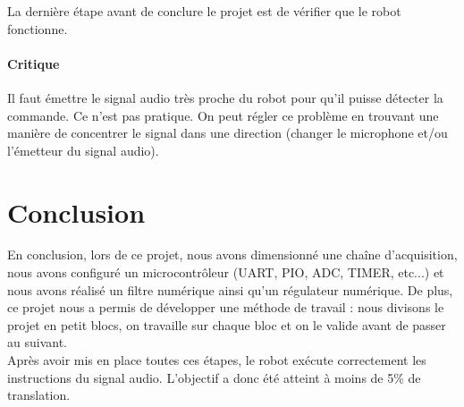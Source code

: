 \documentclass[12pt,a4paper]{ULBReport} %
\begin{document}
La dernière étape avant de conclure le projet est de vérifier que le robot fonctionne.

\subsubsection{Critique}

Il faut émettre le signal audio très proche du robot pour qu'il puisse détecter la commande. Ce n'est pas pratique. On peut régler ce problème en trouvant une manière de concentrer le signal dans une direction (changer le microphone et/ou l'émetteur du signal audio).

\newpage
\chapter{Conclusion}

En conclusion, lors de ce projet, nous avons dimensionné une chaîne d'acquisition, nous avons configuré un microcontrôleur (UART, PIO, ADC, TIMER, etc...) et nous avons réalisé un filtre numérique ainsi qu'un régulateur numérique. De plus, ce projet nous a permis de développer une méthode de travail : nous divisons le projet en petit blocs, on travaille sur chaque bloc et on le valide avant de passer au suivant.\\
Après avoir mis en place toutes ces étapes, le robot exécute correctement les instructions du signal audio. L'objectif a donc été atteint à moins de 5\% de translation. 


\appendix

% 
% 
\end{document}

